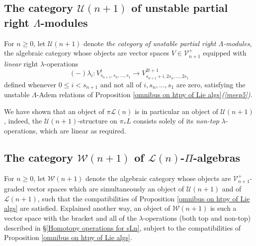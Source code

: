 \documentclass[11pt]{amsart} \renewcommand{\baselinestretch}{1.2}
\theoremstyle{plain}
\newtheorem{prop}[thm]{Proposition}
\numberwithin{equation}{section} %
\theoremstyle{plain}
\newtheorem{prop}[thm]{Proposition}
\numberwithin{equation}{chapter} %
\newcommand{\DASH}{\mathrm{-}}
\renewcommand{\to}{\longrightarrow}
\newcommand{\calU}{\mathcal{U}}
\newcommand{\calL}{\mathcal{L}}
\newcommand{\calV}{\mathcal{V}}
\newcommand{\calw}{\mathcal{W}}
\newcommand{\vect}[2]{\calV^{#1}_{#2}}
\newcommand{\PA}[1]{\pi#1}
\newcommand{\SubsectionOrSection}[1]{\subsection{#1}}
\begin{document}
\begin{homotopy operations for PRLs}
\SubsectionOrSection{The category $\calU(n+1)$ of unstable partial right $\Lambda$-modules}
For $n\geq0$, let $\calU(n+1)$ denote \emph{the category  of unstable partial right $\Lambda$-modules}, the algebraic category whose objects are vector spaces $V\in \vect{+}{n+1}$ equipped with  \emph{linear} right $\lambda$-operations
\[(\DASH)\lambda_i:V_{s_{n+1},s_n,\ldots,s_1}^t\to V_{s_{n+1}+i,2s_n,\ldots,2s_1}^{2t+1}\]
defined whenever $0\leq i< s_{n+1}$ and not all of $i,s_{n},\ldots,s_{1}$ are zero, satisfying the unstable $\Lambda$-Adem relations of Proposition \ref{omnibus on htpy of Lie algs}\emph{(\ref{meep5})}.

We have shown that an object of $\PA{\calL(n)}$ is in particular an object of $\calU(n+1)$, indeed, the $\calU(n+1)$-structure on $\pi_*L$ consists solely of its \emph{non-top} $\lambda$-operations, which are linear as required.
\SubsectionOrSection{The category $\calw(n+1)$ of $\calL(n)$-$\Pi$-algebras}
\label{wn+1 or pialgs section}
For $n\geq0$, let $\calw(n+1)$ denote %
the algebraic category whose objects are $\vect{+}{n+1}$-graded vector spaces which are simultaneously an object of $\calU(n+1)$ and of $\calL(n+1)$, such that the compatibilities of Proposition \ref{omnibus on htpy of Lie algs} are satisfied. Explained another way, an object of $\calw(n+1)$ is such a vector space with the bracket and all of the $\lambda$-operations (both top and non-top) described in \S\ref{Homotopy operations for sLn}, subject to the compatibilities of Proposition \ref{omnibus on htpy of Lie algs}.


\end{homotopy operations for PRLs}
\end{document}
